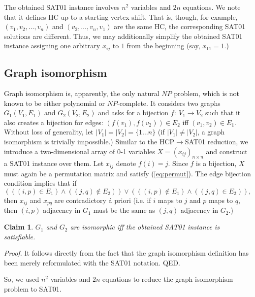 \documentclass[11pt]{article}
\newtheorem{claim}{Claim}
\begin{document}
The obtained SAT01 instance involves $n^2$ variables and $2n$ equations. We note that it defines HC up to a starting vertex shift. That is, though, for example, $(v_1,v_2,\ldots,v_n)$ and $(v_2,\ldots,v_n,v_1)$ are the same HC, the corresponding SAT01 solutions are different. Thus, we may additionally simplify the obtained SAT01 instance assigning one arbitrary $x_{ij}$ to $1$ from the beginning (say, $x_{11}=1$.)


\subsection{Graph isomorphism}
Graph isomorphism is, apparently, the only natural $NP$ problem, which is not known to be either polynomial or $NP$-complete. It considers two graphs $G_1(V_1,E_1)$ and $G_2(V_2,E_2)$ and asks for a bijection $f: \ V_1 \to V_2$ such that it also creates a bijection for edges: $(f(v_1),f(v_2)) \in E_2$ iff $(v_1,v_2) \in E_1$. Without loss of generality, let $|V_1|=|V_2|=\{1 \ldots n\}$ (if $|V_1| \neq |V_2|$, a graph isomorphism is trivially impossible.) Similar to the HCP$\to$SAT01 reduction, we introduce a two-dimensional array of 0-1 variables $X=(x_{ij})_{n \times n}$ and construct a SAT01 instance over them. Let $x_{ij}$ denote $f(i)=j$. Since $f$ is a bijection, $X$ must again be a permutation matrix and satisfy (\ref{eq:permut}). The edge bijection condition implies that if
\begin{equation}
\label{eq:gip_cont}
\left(((i,p) \in E_1) \land ((j,q) \notin E_2)\right) \lor \left(((i,p) \notin E_1) \land ((j,q) \in E_2)\right),
\end{equation}
then $x_{ij}$ and $x_{pq}$ are contradictory \'a priori (i.e. if $i$ maps to $j$ and $p$ maps to $q$, then $(i,p)$ adjacency in $G_1$ must be the same as $(j,q)$ adjacency in $G_2$.)
\begin{claim}
$G_1$ and $G_2$ are isomorphic iff the obtained SAT01 instance is satisfiable.
\end{claim}

{\em Proof.\/} It follows directly from the fact that the graph isomorphism definition has been merely reformulated with the SAT01 notation. QED.

So, we used $n^2$ variables and $2n$ equations to reduce the graph isomorphism problem to SAT01.
\end{document}
